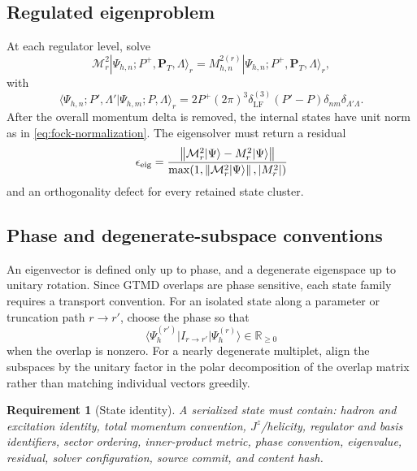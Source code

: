 \documentclass[11pt]{article}
\newtheorem{requirement}[definition]{Requirement}
\newcommand{\PT}{\bm{P}_{T}}
\newcommand{\LF}{\mathrm{LF}}
\newcommand{\cM}{\mathcal M}
\newcommand{\norm}[1]{\left\lVert#1\right\rVert}
\begin{document}
\subsection{Regulated eigenproblem}

At each regulator level, solve
\begin{equation}
 \cM_r^2|\Psi_{h,n};P^+,\PT,\Lambda\rangle_r
 =M_{h,n}^{2(r)}
 |\Psi_{h,n};P^+,\PT,\Lambda\rangle_r,
\label{eq:regulated-eigenproblem}
\end{equation}
with
\begin{equation}
 \langle\Psi_{h,n};P',\Lambda'|
 \Psi_{h,m};P,\Lambda\rangle_r
 =2P^+(2\pi)^3\delta^{(3)}_{\LF}(P'-P)
 \delta_{nm}\delta_{\Lambda'\Lambda}.
\label{eq:hadron-state-normalization}
\end{equation}
After the overall momentum delta is removed, the internal states have unit
norm as in \cref{eq:fock-normalization}.  The eigensolver must return a
residual
\begin{equation}
 \epsilon_{\rm eig}
 =\frac{\norm{\cM_r^2|\Psi\rangle-M_r^2|\Psi\rangle}}
 {\max(1,\norm{\cM_r^2|\Psi\rangle},|M_r^2|)}
\label{eq:eigensolver-residual}
\end{equation}
and an orthogonality defect for every retained state cluster.

\subsection{Phase and degenerate-subspace conventions}

An eigenvector is defined only up to phase, and a degenerate eigenspace up to
unitary rotation.  Since GTMD overlaps are phase sensitive, each state family
requires a transport convention.  For an isolated state along a parameter or
truncation path \(r\to r'\), choose the phase so that
\begin{equation}
 \langle\Psi_h^{(r')}|I_{r\to r'}|\Psi_h^{(r)}\rangle
 \in\mathbb R_{\ge0}
\label{eq:phase-transport}
\end{equation}
when the overlap is nonzero.  For a nearly degenerate multiplet, align the
subspaces by the unitary factor in the polar decomposition of the overlap
matrix rather than matching individual vectors greedily.

\begin{requirement}[State identity]
\label{req:state-identity}
A serialized state must contain: hadron and excitation identity, total
momentum convention, \(J^z\)/helicity, regulator and basis identifiers,
sector ordering, inner-product metric, phase convention, eigenvalue,
residual, solver configuration, source commit, and content hash.
\end{requirement}
\end{document}
